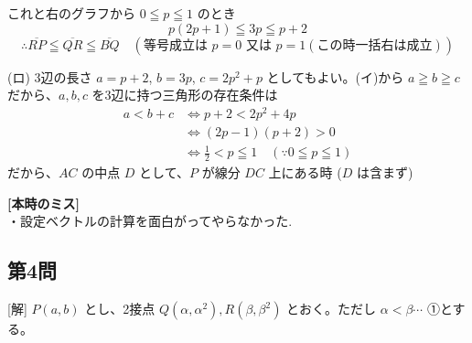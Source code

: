 \documentclass[../main.tex]{subfiles}
\begin{document}
\begin{center}
\end{center}

これと右のグラフから $0 \leqq p \leqq 1$ のとき
\[
  p(2p+1) \leqq 3p \leqq p+2
\]
\[
  \therefore \overline{RP} \leqq \overline{QR} \leqq \overline{BQ} \quad (\text{等号成立は } p=0 \text{ 又は } p=1 (\text{この時一括右は成立}))
\]

(ロ) 3辺の長さ $a = p+2$, $b = 3p$, $c = 2p^2+p$ としてもよい。(イ)から $a \geqq b \geqq c$ だから、$a, b, c$ を3辺に持つ三角形の存在条件は
\[
  \begin{aligned}
    a < b+c &\iff p+2 < 2p^2 + 4p \\
    &\iff (2p-1)(p+2) > 0 \\
    &\iff \frac{1}{2} < p \leqq 1 \quad (\because 0 \leqq p \leqq 1)
  \end{aligned}
\]
だから、$AC$ の中点 $D$ として、$P$ が線分 $DC$ 上にある時 ($D$ は含まず)

\noindent
\textbf{[本時のミス]}\\
・設定ベクトルの計算を面白がってやらなかった.

\subsection*{第4問}

[解] $P(a, b)$ とし、2接点 $Q(\alpha, \alpha^2), R(\beta, \beta^2)$ とおく。ただし $\alpha < \beta \cdots$ ①とする。
\end{document}
